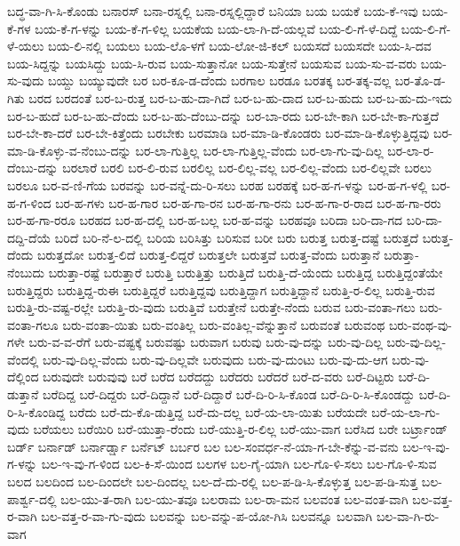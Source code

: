 {ಬದ್ಧ-ವಾ-ಗಿ-ಸಿ-ಕೊಂಡು
ಬನಾರಸ್
ಬನಾ-ರಸ್ನಲ್ಲಿ
ಬನಾ-ರಸ್ನಲ್ಲಿದ್ದಾರೆ
ಬನಿಯಾ
ಬಯ
ಬಯಕೆ
ಬಯ-ಕೆ-ಇವು
ಬಯ-ಕೆ-ಗಳ
ಬಯ-ಕೆ-ಗ-ಳನ್ನು
ಬಯ-ಕೆ-ಗ-ಳಿಲ್ಲ
ಬಯಕೆಯ
ಬಯ-ಲಾ-ಗಿ-ದೆ-ಯಲ್ಲವೆ
ಬಯ-ಲಿ-ಗೆ-ಳೆ-ದಿದ್ದೆ
ಬಯ-ಲಿ-ಗೆ-ಳೆ-ಯಲು
ಬಯ-ಲಿ-ನಲ್ಲಿ
ಬಯಲು
ಬಯ-ಲೊ-ಳಗೆ
ಬಯ-ಲೋ-ಜಿ-ಕಲ್
ಬಯಸದೆ
ಬಯಸದೇ
ಬಯ-ಸಿ-ದವ
ಬಯ-ಸಿದ್ದನ್ನು
ಬಯಸಿದ್ದು
ಬಯ-ಸಿ-ರುವ
ಬಯ-ಸುತ್ತಾನೋ
ಬಯ-ಸುತ್ತೇನೆ
ಬಯಸುವ
ಬಯ-ಸು-ವ-ವರು
ಬಯ-ಸು-ವುದು
ಬಯ್ದು
ಬಯ್ಯುವುದೇ
ಬರ
ಬರ-ಕೂ-ಡ-ದೆಂದು
ಬರಗಾಲ
ಬರಡೂ
ಬರತಕ್ಕ
ಬರ-ತಕ್ಕ-ವಲ್ಲ
ಬರ-ತೊ-ಡ-ಗಿತು
ಬರದ
ಬರದಂತೆ
ಬರ-ಬ-ರುತ್ತ
ಬರ-ಬ-ಹು-ದಾ-ಗಿದೆ
ಬರ-ಬ-ಹು-ದಾದ
ಬರ-ಬ-ಹುದು
ಬರ-ಬ-ಹು-ದು-ಇದು
ಬರ-ಬ-ಹುದೆ
ಬರ-ಬ-ಹು-ದೆಂದು
ಬರ-ಬ-ಹು-ದೆಂಬು-ದನ್ನು
ಬರ-ಬಾ-ರದು
ಬರ-ಬೇ-ಕಾಗಿ
ಬರ-ಬೇ-ಕಾ-ಗುತ್ತದೆ
ಬರ-ಬೇ-ಕಾ-ದರೆ
ಬರ-ಬೇ-ಕಿತ್ತೆಂದು
ಬರಬೇಕು
ಬರಮಾಡಿ
ಬರ-ಮಾ-ಡಿ-ಕೊಂಡರು
ಬರ-ಮಾ-ಡಿ-ಕೊಳ್ಳುತ್ತಿದ್ದವು
ಬರ-ಮಾ-ಡಿ-ಕೊಳ್ಳು-ವ-ನೆಂಬು-ದನ್ನು
ಬರ-ಲಾ-ಗುತ್ತಿಲ್ಲ
ಬರ-ಲಾ-ಗುತ್ತಿಲ್ಲ-ವೆಂದು
ಬರ-ಲಾ-ಗು-ವು-ದಿಲ್ಲ
ಬರ-ಲಾ-ರ-ದೆಂಬು-ದನ್ನು
ಬರಲಾರೆ
ಬರಲಿ
ಬರ-ಲಿ-ರುವ
ಬರಲಿಲ್ಲ
ಬರ-ಲಿಲ್ಲ-ವಲ್ಲ
ಬರ-ಲಿಲ್ಲ-ವೆಂದು
ಬರ-ಲಿಲ್ಲವೇ
ಬರಲು
ಬರಲೂ
ಬರ-ವ-ಣಿ-ಗೆಯ
ಬರವನ್ನು
ಬರ-ವನ್ನೆ-ದು-ರಿ-ಸಲು
ಬರಹ
ಬರಹಕ್ಕೆ
ಬರ-ಹ-ಗ-ಳನ್ನು
ಬರ-ಹ-ಗ-ಳಲ್ಲಿ
ಬರ-ಹ-ಗ-ಳಿಂದ
ಬರ-ಹ-ಗಳು
ಬರ-ಹ-ಗಾರ
ಬರ-ಹ-ಗಾ-ರನ
ಬರ-ಹ-ಗಾ-ರನು
ಬರ-ಹ-ಗಾ-ರ-ರಾದ
ಬರ-ಹ-ಗಾ-ರರು
ಬರ-ಹ-ಗಾ-ರರೂ
ಬರಹದ
ಬರ-ಹ-ದಲ್ಲಿ
ಬರ-ಹ-ಬಲ್ಲ
ಬರ-ಹ-ವನ್ನು
ಬರಹವೂ
ಬರಿದಾ
ಬರಿ-ದಾ-ಗದ
ಬರಿ-ದಾ-ದದ್ದಿ-ದೆಯೆ
ಬರಿದೆ
ಬರಿ-ನೆ-ಲ-ದಲ್ಲಿ
ಬರಿಯ
ಬರಿಸಿತ್ತು
ಬರಿಸುವ
ಬರೀ
ಬರು
ಬರುತ್ತ
ಬರುತ್ತ-ದಷ್ಟೆ
ಬರುತ್ತದೆ
ಬರುತ್ತ-ದೆಂದು
ಬರುತ್ತದೋ
ಬರುತ್ತ-ಲಿದೆ
ಬರುತ್ತ-ಲಿದ್ದರೆ
ಬರುತ್ತಲೇ
ಬರುತ್ತವೆ
ಬರುತ್ತ-ವೆಂದು
ಬರುತ್ತಾನೆ
ಬರುತ್ತಾ-ನೆಂಬುದು
ಬರುತ್ತಾ-ರಷ್ಟೆ
ಬರುತ್ತಾರೆ
ಬರುತ್ತಿ
ಬರುತ್ತಿತ್ತು
ಬರುತ್ತಿದೆ
ಬರುತ್ತಿ-ದೆ-ಯೆಂದು
ಬರುತ್ತಿದ್ದ
ಬರುತ್ತಿದ್ದಂತೆಯೇ
ಬರುತ್ತಿದ್ದರು
ಬರುತ್ತಿದ್ದ-ರುಈ
ಬರುತ್ತಿದ್ದರೆ
ಬರುತ್ತಿದ್ದವು
ಬರುತ್ತಿದ್ದಾಗ
ಬರುತ್ತಿದ್ದಾನೆ
ಬರುತ್ತಿ-ರ-ಲಿಲ್ಲ
ಬರುತ್ತಿ-ರುವ
ಬರುತ್ತಿ-ರು-ವಷ್ಟ-ರಲ್ಲೇ
ಬರುತ್ತಿ-ರು-ವುದು
ಬರುತ್ತಿವೆ
ಬರುತ್ತೇನೆ
ಬರುತ್ತೇ-ನೆಂದು
ಬರುವ
ಬರು-ವಂತಾ-ಗಲು
ಬರು-ವಂತಾ-ಗಲೂ
ಬರು-ವಂತಾ-ಯಿತು
ಬರು-ವಂತಿಲ್ಲ
ಬರು-ವಂತಿಲ್ಲ-ವೆನ್ನುತ್ತಾನೆ
ಬರುವಂತೆ
ಬರುವಂಥ
ಬರು-ವಂಥ-ವು-ಗಳೇ
ಬರು-ವ-ವ-ರೆಗೆ
ಬರು-ವಷ್ಟಕ್ಕೆ
ಬರುವಷ್ಟು
ಬರುವಾಗ
ಬರುವು
ಬರು-ವು-ದನ್ನು
ಬರು-ವು-ದಿಲ್ಲ
ಬರು-ವು-ದಿಲ್ಲ-ವೆಂದಲ್ಲಿ
ಬರು-ವು-ದಿಲ್ಲ-ವೆಂದು
ಬರು-ವು-ದಿಲ್ಲವೇ
ಬರುವುದು
ಬರು-ವು-ದುಂಟು
ಬರು-ವು-ದು-ಆಗ
ಬರು-ವು-ದೆಲ್ಲಿಂದ
ಬರುವುದೇ
ಬರುವುವು
ಬರೆ
ಬರೆದ
ಬರೆದದ್ದು
ಬರೆದರು
ಬರೆದರೆ
ಬರೆ-ದ-ವರು
ಬರೆ-ದಿಟ್ಟರು
ಬರೆ-ದಿ-ಡುತ್ತಾನೆ
ಬರೆದಿದ್ದ
ಬರೆ-ದಿದ್ದರು
ಬರೆ-ದಿದ್ದಾನೆ
ಬರೆ-ದಿದ್ದಾರೆ
ಬರೆ-ದಿ-ರಿ-ಸಿ-ಕೊಂಡ
ಬರೆ-ದಿ-ರಿ-ಸಿ-ಕೊಂಡದ್ದು
ಬರೆ-ದಿ-ರಿ-ಸಿ-ಕೊಂಡಿದ್ದ
ಬರೆದು
ಬರೆ-ದು-ಕೊ-ಡುತ್ತಿದ್ದ
ಬರೆ-ದು-ದಲ್ಲ
ಬರೆ-ಯ-ಲಾ-ಯಿತು
ಬರೆಯದೇ
ಬರೆ-ಯ-ಲಾ-ಗು-ವುದು
ಬರೆಯಲು
ಬರೆಯಿರಿ
ಬರೆ-ಯುತ್ತಾ-ರೆಂದು
ಬರೆ-ಯುತ್ತಿ-ರ-ಲಿಲ್ಲ
ಬರೆ-ಯು-ವಾಗ
ಬರೆಸಿದ
ಬರೇ
ಬರ್ಟ್ರಾಂಡ್
ಬರ್ಡ್
ಬರ್ನಾಡ್
ಬರ್ನಾರ್ಡ್ಷಾ
ಬರ್ನೆಟ್
ಬರ್ಬರ
ಬಲ
ಬಲ-ಸಂವರ್ಧ-ನೆ-ಯಾ-ಗ-ಬೇ-ಕೆನ್ನು-ವ-ವನು
ಬಲ-ಇ-ವು-ಗ-ಳನ್ನು
ಬಲ-ಇ-ವು-ಗ-ಳಿಂದ
ಬಲ-ಕಿ-ಸೆ-ಯಿಂದ
ಬಲಗಳ
ಬಲ-ಗೈ-ಯಾಗಿ
ಬಲ-ಗೊ-ಳಿ-ಸಲು
ಬಲ-ಗೊ-ಳಿ-ಸುವ
ಬಲದ
ಬಲದಿಂದ
ಬಲ-ದಿಂದಲೇ
ಬಲ-ದಿಂದಲ್ಲ
ಬಲ-ದೆ-ದು-ರಲ್ಲಿ
ಬಲ-ಪ-ಡಿ-ಸಿ-ಕೊಳ್ಳುತ್ತ
ಬಲ-ಪ-ಡಿ-ಸುತ್ತ
ಬಲ-ಪಾರ್ಶ್ವ-ದಲ್ಲಿ
ಬಲ-ಯು-ತ-ರಾಗಿ
ಬಲ-ಯು-ತವೂ
ಬಲರಾಮ
ಬಲ-ರಾ-ಮನ
ಬಲವಂತ
ಬಲ-ವಂತ-ವಾಗಿ
ಬಲ-ವತ್ತ-ರ-ವಾಗಿ
ಬಲ-ವತ್ತ-ರ-ವಾ-ಗು-ವುದು
ಬಲವನ್ನು
ಬಲ-ವನ್ನು-ಪ-ಯೋ-ಗಿಸಿ
ಬಲವನ್ನೂ
ಬಲವಾಗಿ
ಬಲ-ವಾ-ಗಿ-ರು-ವಾಗ
}
